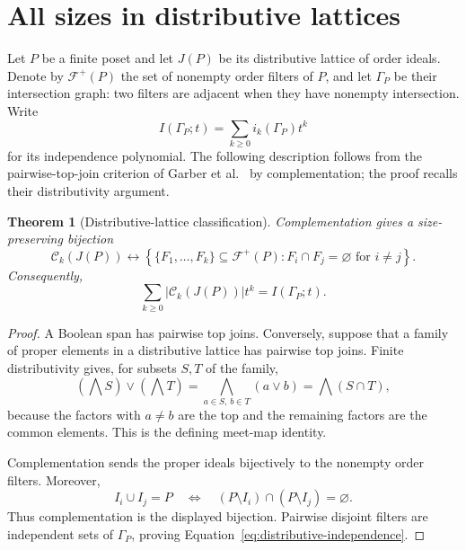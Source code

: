 \documentclass[11pt]{article}
\newtheorem{theorem}{Theorem}[section]
\theoremstyle{definition}
\theoremstyle{remark}
\newcommand{\cC}{\mathcal C}
\begin{document}
\section{All sizes in distributive lattices}

Let $P$ be a finite poset and let $J(P)$ be its distributive lattice of order
ideals.  Denote by $\mathcal F^+(P)$ the set of nonempty order filters of
$P$, and let $\Gamma_P$ be their intersection graph: two filters are adjacent
when they have nonempty intersection.  Write
\[
 I(\Gamma_P;t)=\sum_{k\ge0}i_k(\Gamma_P)t^k
\]
for its independence polynomial.  The following description follows from the
pairwise-top-join criterion of Garber et al.\ \cite[Lemma~2.4]{GarberEtAl2026}
by complementation; the proof recalls their distributivity argument.

\begin{theorem}[Distributive-lattice classification]\label{thm:distributive}
Complementation gives a size-preserving bijection
\[
 \cC_k(J(P))
 \longleftrightarrow
 \left\{\{F_1,\ldots,F_k\}\subseteq\mathcal F^+(P):
 F_i\cap F_j=\varnothing\text{ for }i\ne j\right\}.
\]
Consequently,
\begin{equation}\label{eq:distributive-independence}
 \sum_{k\ge0}|\cC_k(J(P))|t^k=I(\Gamma_P;t).
\end{equation}
\end{theorem}

\begin{proof}
A Boolean span has pairwise top joins.  Conversely, suppose that a family of
proper elements in a distributive lattice has pairwise top joins.  Finite
distributivity gives, for subsets $S,T$ of the family,
\[
 \left(\bigwedge S\right)\vee\left(\bigwedge T\right)
 =\bigwedge_{a\in S,\,b\in T}(a\vee b)
 =\bigwedge(S\cap T),
\]
because the factors with $a\ne b$ are the top and the remaining factors are
the common elements.  This is the defining meet-map identity.

Complementation sends the proper ideals bijectively to the nonempty order
filters.  Moreover,
\[
 I_i\cup I_j=P
 \quad\Longleftrightarrow\quad
 (P\setminus I_i)\cap(P\setminus I_j)=\varnothing.
\]
Thus complementation is the displayed bijection.
Pairwise disjoint filters
are independent sets of $\Gamma_P$, proving
Equation~\eqref{eq:distributive-independence}.
\end{proof}
\end{document}
